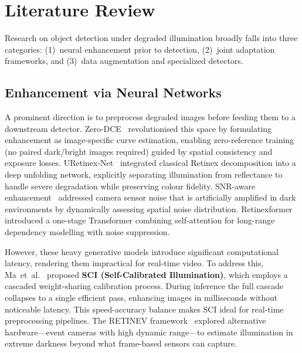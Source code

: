\documentclass[conference]{IEEEtran}
\begin{document}
\section{Literature Review}
\label{sec:litreview}

Research on object detection under degraded illumination broadly falls
into three categories: (1)~neural enhancement prior to detection,
(2)~joint adaptation frameworks, and (3)~data augmentation and
specialized detectors.

\subsection{Enhancement via Neural Networks}

A prominent direction is to preprocess degraded images before feeding
them to a downstream detector. Zero-DCE~\cite{guo2020zerodce}
revolutionised this space by formulating enhancement as image-specific
curve estimation, enabling zero-reference training (no paired
dark/bright images required) guided by spatial consistency and exposure
losses. URetinex-Net~\cite{wu2022uretinex} integrated classical Retinex
decomposition into a deep unfolding network, explicitly separating
illumination from reflectance to handle severe degradation while
preserving colour fidelity. SNR-aware enhancement~\cite{xu2022snr}
addressed camera sensor noise that is artificially amplified in dark
environments by dynamically assessing spatial noise distribution.
Retinexformer~\cite{cai2023retinexformer} introduced a one-stage
Transformer combining self-attention for long-range dependency modelling
with noise suppression.

However, these heavy generative models introduce significant
computational latency, rendering them impractical for real-time video.
To address this, Ma~et~al.~\cite{ma2022sci} proposed \textbf{SCI
(Self-Calibrated Illumination)}, which employs a cascaded
weight-sharing calibration process. During inference the full cascade
collapses to a single efficient pass, enhancing images in milliseconds
without noticeable latency. This speed-accuracy balance makes SCI ideal
for real-time preprocessing pipelines. The RETINEV
framework~\cite{sun2025retinev} explored alternative hardware---event
cameras with high dynamic range---to estimate illumination in extreme
darkness beyond what frame-based sensors can capture.
\end{document}
